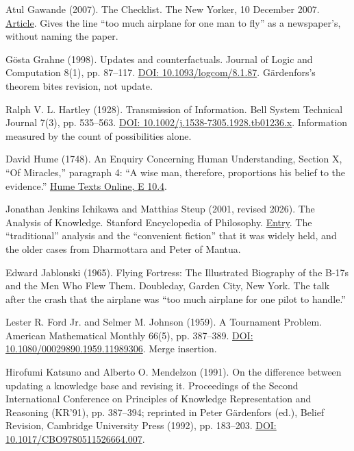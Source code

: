 \noindent Atul Gawande (2007). The Checklist. The New Yorker, 10 December 2007. \href{https://www.newyorker.com/magazine/2007/12/10/the-checklist}{Article}. Gives the line ``too much airplane for one man to fly'' as a newspaper's, without naming the paper.
\par\medskip

\noindent G\"osta Grahne (1998). Updates and counterfactuals. Journal of Logic and Computation 8(1), pp. 87--117. \href{https://doi.org/10.1093/logcom/8.1.87}{DOI: 10.1093/logcom/8.1.87}. G\"ardenfors's theorem bites revision, not update.
\par\medskip

\noindent Ralph V. L. Hartley (1928). Transmission of Information. Bell System Technical Journal 7(3), pp. 535--563. \href{https://doi.org/10.1002/j.1538-7305.1928.tb01236.x}{DOI: 10.1002/j.1538-7305.1928.tb01236.x}. Information measured by the count of possibilities alone.
\par\medskip

\noindent David Hume (1748). An Enquiry Concerning Human Understanding, Section X, ``Of Miracles,'' paragraph 4: ``A wise man, therefore, proportions his belief to the evidence.'' \href{https://davidhume.org/texts/e/10}{Hume Texts Online, E 10.4}.
\par\medskip

\noindent Jonathan Jenkins Ichikawa and Matthias Steup (2001, revised 2026). The Analysis of Knowledge. Stanford Encyclopedia of Philosophy. \href{https://plato.stanford.edu/entries/knowledge-analysis/}{Entry}. The ``traditional'' analysis and the ``convenient fiction'' that it was widely held, and the older cases from Dharmottara and Peter of Mantua.
\par\medskip

\noindent Edward Jablonski (1965). Flying Fortress: The Illustrated Biography of the B-17s and the Men Who Flew Them. Doubleday, Garden City, New York. The talk after the crash that the airplane was ``too much airplane for one pilot to handle.''
\par\medskip

\noindent Lester R. Ford Jr. and Selmer M. Johnson (1959). A Tournament Problem. American Mathematical Monthly 66(5), pp. 387--389. \href{https://doi.org/10.1080/00029890.1959.11989306}{DOI: 10.1080/00029890.1959.11989306}. Merge insertion.
\par\medskip

\noindent Hirofumi Katsuno and Alberto O. Mendelzon (1991). On the difference between updating a knowledge base and revising it. Proceedings of the Second International Conference on Principles of Knowledge Representation and Reasoning (KR'91), pp. 387--394; reprinted in Peter G\"ardenfors (ed.), Belief Revision, Cambridge University Press (1992), pp. 183--203. \href{https://doi.org/10.1017/CBO9780511526664.007}{DOI: 10.1017/CBO9780511526664.007}.
\par\medskip

